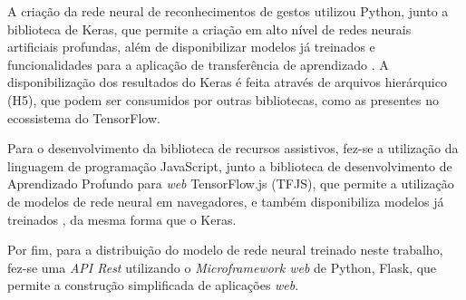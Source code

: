 \par A criação da rede neural de reconhecimentos de gestos utilizou Python, junto a biblioteca de Keras, que permite a criação em alto nível de redes neurais artificiais profundas, além de disponibilizar modelos já treinados e funcionalidades para a aplicação de transferência de aprendizado \cite{chollet2015}. A disponibilização dos resultados do Keras é feita através de arquivos hierárquico (H5), que podem ser consumidos por outras bibliotecas, como as presentes no ecossistema do TensorFlow.

\par Para o desenvolvimento da biblioteca de recursos assistivos, fez-se a utilização da linguagem de programação JavaScript, junto a biblioteca de desenvolvimento de Aprendizado Profundo para \textit{web} TensorFlow.js (TFJS), que permite a utilização de modelos de rede neural em navegadores, e também disponibiliza modelos já treinados \cite{tensorflowjs2019}, da mesma forma que o Keras.

\par Por fim, para a distribuição do modelo de rede neural treinado neste trabalho, fez-se uma \textit{API Rest} utilizando o \textit{Microframework web} de Python, Flask, que permite a construção simplificada de aplicações \textit{web}.







